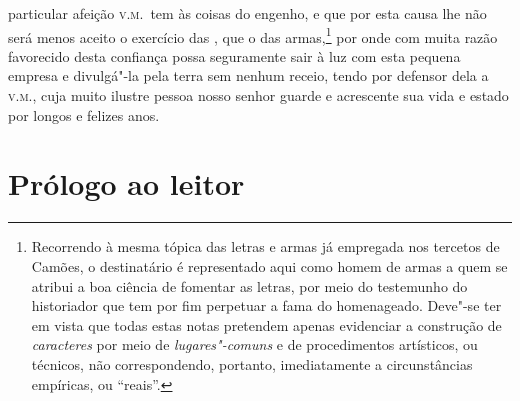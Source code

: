 particular afeição \textsc{v.m.}~tem às coisas do engenho, e que por esta causa		%
lhe não será menos aceito o exercício das , que o das
armas,\footnote{ Recorrendo à mesma tópica das letras e armas já
empregada nos tercetos de Camões, o destinatário  é representado aqui
como homem de armas a quem se atribui a boa ciência de fomentar as
letras, por meio do testemunho do historiador que tem por fim perpetuar
a fama do homenageado. Deve"-se ter em vista que todas estas notas
pretendem apenas evidenciar a construção de \textit{caracteres} por
meio de \textit{lugares"-comuns} e de procedimentos artísticos, ou
técnicos, não correspondendo, portanto, imediatamente a circunstâncias
empíricas, ou ``reais''.} por onde com muita
razão favorecido desta confiança possa seguramente sair à luz com esta
pequena empresa e divulgá"-la pela terra sem nenhum receio, tendo por
defensor dela a \textsc{v.m.}, cuja muito ilustre pessoa nosso senhor guarde e
acrescente sua vida e estado por longos e felizes anos. 

\chapter[Prólogo ao leitor]{Prólogo ao leitor}


